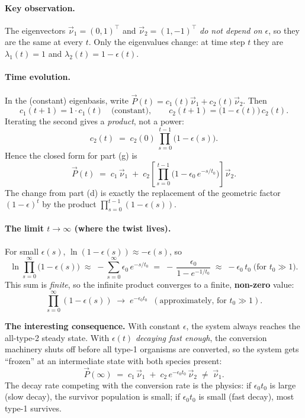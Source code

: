 \documentclass[12pt,a4paper]{article}
\newcommand{\vnu}{\vec{\nu}}
\newcommand{\vP}{\vec{P}}
\begin{document}
\paragraph{Key observation.} The eigenvectors $\vnu_1 = (0,1)^{\top}$ and $\vnu_2 = (1,-1)^{\top}$ \emph{do not depend on $\epsilon$}, so they are the same at every $t$. Only the eigenvalues change: at time step $t$ they are $\lambda_1(t) = 1$ and $\lambda_2(t) = 1 - \epsilon(t)$.

\paragraph{Time evolution.} In the (constant) eigenbasis, write $\vP(t) = c_1(t)\vnu_1 + c_2(t)\vnu_2$. Then
\[
c_1(t+1) = 1\cdot c_1(t) \quad\text{(constant)}, \qquad c_2(t+1) = \bigl(1-\epsilon(t)\bigr)\,c_2(t).
\]
Iterating the second gives a \emph{product}, not a power:
\[
c_2(t) \;=\; c_2(0)\,\prod_{s=0}^{t-1}\bigl(1-\epsilon(s)\bigr).
\]
Hence the closed form for part (g) is
\[
\boxed{\;\vP(t) \;=\; c_1\,\vnu_1 \;+\; c_2\left[\prod_{s=0}^{t-1}\bigl(1-\epsilon_0\,e^{-s/t_0}\bigr)\right]\vnu_2.\;}
\]
The change from part (d) is exactly the replacement of the geometric factor $(1-\epsilon)^t$ by the product $\prod_{s=0}^{t-1}(1-\epsilon(s))$.

\paragraph{The limit $t\to\infty$ (where the twist lives).} For small $\epsilon(s)$, $\ln(1-\epsilon(s)) \approx -\epsilon(s)$, so
\[
\ln\!\prod_{s=0}^{\infty}\bigl(1-\epsilon(s)\bigr) \;\approx\; -\sum_{s=0}^{\infty}\epsilon_0\,e^{-s/t_0} \;=\; -\,\frac{\epsilon_0}{1 - e^{-1/t_0}} \;\approx\; -\epsilon_0\,t_0 \;\text{(for } t_0\gg 1\text{)}.
\]
This sum is \emph{finite}, so the infinite product converges to a finite, \textbf{non-zero} value:
\[
\prod_{s=0}^{\infty}(1-\epsilon(s)) \;\to\; e^{-\epsilon_0 t_0} \;\;(\text{approximately, for } t_0 \gg 1).
\]
\begin{insight}
\textbf{The interesting consequence.} With constant $\epsilon$, the system always reaches the all-type-2 steady state. With $\epsilon(t)$ \emph{decaying fast enough}, the conversion machinery shuts off before all type-1 organisms are converted, so the system gets ``frozen'' at an intermediate state with both species present:
\[
\vP(\infty) \;=\; c_1\,\vnu_1 \;+\; c_2\, e^{-\epsilon_0 t_0}\,\vnu_2 \;\neq\; \vnu_1.
\]
The decay rate competing with the conversion rate is the physics: if $\epsilon_0 t_0$ is large (slow decay), the survivor population is small; if $\epsilon_0 t_0$ is small (fast decay), most type-1 survives.
\end{insight}
\end{document}
